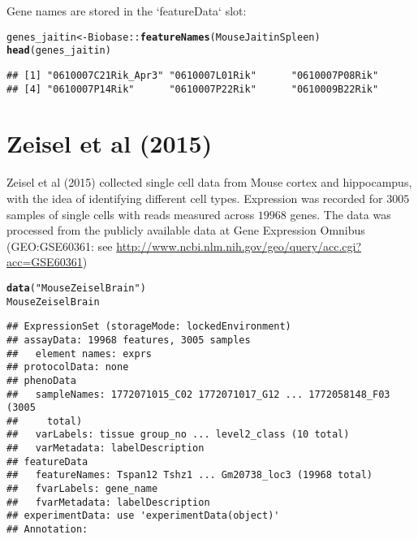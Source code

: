 \documentclass[12pt]{article}\usepackage[]{graphicx}\usepackage[usenames,dvipsnames]{color}
\makeatletter
\newcommand{\hlstr}[1]{\textcolor[rgb]{0.192,0.494,0.8}{#1}}%
\newcommand{\hlopt}[1]{\textcolor[rgb]{0,0,0}{#1}}%
\newcommand{\hlstd}[1]{\textcolor[rgb]{0.345,0.345,0.345}{#1}}%
\newcommand{\hlkwb}[1]{\textcolor[rgb]{0.69,0.353,0.396}{#1}}%
\newcommand{\hlkwd}[1]{\textcolor[rgb]{0.737,0.353,0.396}{\textbf{#1}}}%
\newenvironment{kframe}{%
 \def\at@end@of@kframe{}%
 \ifinner\ifhmode%
  \def\at@end@of@kframe{\end{minipage}}%
  \begin{minipage}{\columnwidth}%
 \fi\fi%
 \def\FrameCommand##1{\hskip\@totalleftmargin \hskip-\fboxsep
 \colorbox{shadecolor}{##1}\hskip-\fboxsep
     \hskip-\linewidth \hskip-\@totalleftmargin \hskip\columnwidth}%
 \MakeFramed {\advance\hsize-\width
   \@totalleftmargin\z@ \linewidth\hsize
   \@setminipage}}%
 {\par\unskip\endMakeFramed%
 \at@end@of@kframe}
\newenvironment{knitrout}{}{} %
\makeatother
\begin{document}
Gene names are stored in the `featureData` slot:

\begin{knitrout}
\color{fgcolor}\begin{kframe}
\begin{alltt}
\hlstd{genes_jaitin} \hlkwb{<-} \hlstd{Biobase}\hlopt{::}\hlkwd{featureNames}\hlstd{(MouseJaitinSpleen)}
\hlkwd{head}\hlstd{(genes_jaitin)}
\end{alltt}
\begin{verbatim}
## [1] "0610007C21Rik_Apr3" "0610007L01Rik"      "0610007P08Rik"     
## [4] "0610007P14Rik"      "0610007P22Rik"      "0610009B22Rik"
\end{verbatim}
\end{kframe}
\end{knitrout}


\section{Zeisel et al (2015)}

Zeisel et al (2015) \cite{Zeisel2015} collected single cell data from Mouse
cortex and hippocampus, with the idea of identifying different cell types.
Expression was recorded for $3005$ samples of single cells with reads measured
across $19968$ genes. The data was processed from the publicly available data at
Gene Expression Omnibus (GEO:GSE60361: see
\url{http://www.ncbi.nlm.nih.gov/geo/query/acc.cgi?acc=GSE60361})

\begin{knitrout}
\color{fgcolor}\begin{kframe}
\begin{alltt}
\hlkwd{data}\hlstd{(}\hlstr{"MouseZeiselBrain"}\hlstd{)}
\hlstd{MouseZeiselBrain}
\end{alltt}
\begin{verbatim}
## ExpressionSet (storageMode: lockedEnvironment)
## assayData: 19968 features, 3005 samples 
##   element names: exprs 
## protocolData: none
## phenoData
##   sampleNames: 1772071015_C02 1772071017_G12 ... 1772058148_F03 (3005
##     total)
##   varLabels: tissue group_no ... level2_class (10 total)
##   varMetadata: labelDescription
## featureData
##   featureNames: Tspan12 Tshz1 ... Gm20738_loc3 (19968 total)
##   fvarLabels: gene_name
##   fvarMetadata: labelDescription
## experimentData: use 'experimentData(object)'
## Annotation:
\end{verbatim}
\end{kframe}
\end{knitrout}
\end{document}
